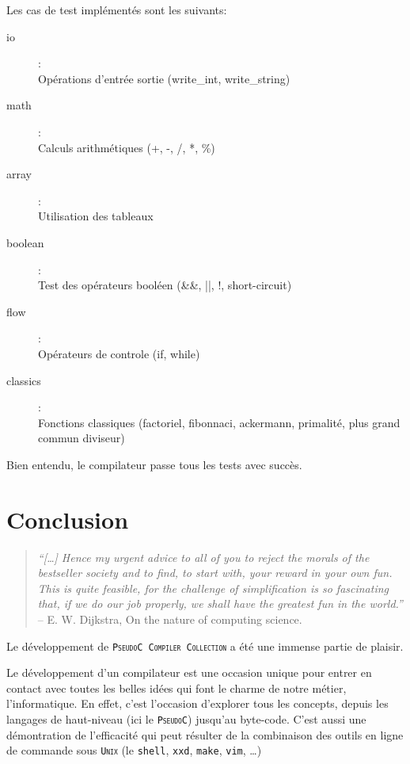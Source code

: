 \documentclass[12pt,a4paper,openright]{report}
\newcommand{\nom}[1]{\textsc{\texttt{#1}}}
\newcommand{\pc}{\nom{PseudoC}}
\newcommand{\pcc}{\nom{PseudoC Compiler Collection}}
\begin{document}
        Les cas de test implémentés sont les suivants:
        \begin{description}
            \item[io]:\\ Opérations d'entrée sortie (write\_int,
            write\_string)
            \item[math]:\\ Calculs arithmétiques (+, -, /, *, \%)
            \item[array]:\\ Utilisation des tableaux
            \item[boolean]:\\ Test des opérateurs booléen (\&\&, ||, !, short-circuit)
            \item[flow]:\\ Opérateurs de controle (if, while)
            \item[classics]:\\ Fonctions classiques (factoriel, fibonnaci,
            ackermann, primalité, plus grand commun diviseur)
        \end{description}

        Bien entendu, le compilateur passe tous les tests avec succès.

\chapter{Conclusion}
\begin{quote}
\emph{``[\dots] Hence my urgent advice to all of you to reject the morals of the
bestseller society and to find, to start with, your reward in your own
fun. This is quite feasible, for the challenge of simplification is so
fascinating that, if we do our job properly, we shall have the greatest
fun in the world.''} \\
-- E. W. Dijkstra, On the nature of computing science.\cite{ONCS}
\end{quote}

    Le développement de \pcc{} a été une immense partie de plaisir.

    Le développement d'un compilateur est une occasion unique pour entrer en
    contact avec toutes les belles idées qui font le charme de notre métier,
    l'informatique. En effet, c'est l'occasion d'explorer tous les concepts,
    depuis les langages de haut-niveau (ici le \pc) jusqu'au byte-code. C'est
    aussi une démontration de l'efficacité qui peut résulter de la combinaison
    des outils en ligne de commande sous \nom{Unix} (le \texttt{shell},
    \texttt{xxd}, \texttt{make}, \texttt{vim}, \ldots)
\end{document}
